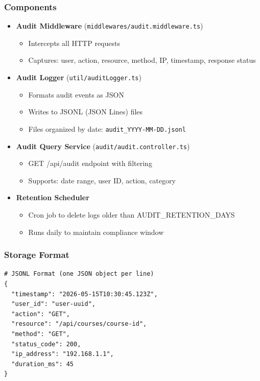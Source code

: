 \documentclass[12pt,oneside,a4paper]{article}
\begin{document}
\subsubsection{Components}
\begin{itemize}
    \item \textbf{Audit Middleware} (\texttt{middlewares/audit.middleware.ts})
        \begin{itemize}
            \item Intercepts all HTTP requests
            \item Captures: user, action, resource, method, IP, timestamp, response status
        \end{itemize}
    \item \textbf{Audit Logger} (\texttt{util/auditLogger.ts})
        \begin{itemize}
            \item Formats audit events as JSON
            \item Writes to JSONL (JSON Lines) files
            \item Files organized by date: \texttt{audit\_YYYY-MM-DD.jsonl}
        \end{itemize}
    \item \textbf{Audit Query Service} (\texttt{audit/audit.controller.ts})
        \begin{itemize}
            \item GET /api/audit endpoint with filtering
            \item Supports: date range, user ID, action, category
        \end{itemize}
    \item \textbf{Retention Scheduler}
        \begin{itemize}
            \item Cron job to delete logs older than AUDIT\_RETENTION\_DAYS
            \item Runs daily to maintain compliance window
        \end{itemize}
\end{itemize}

\subsubsection{Storage Format}
\begin{lstlisting}
# JSONL Format (one JSON object per line)
{
  "timestamp": "2026-05-15T10:30:45.123Z",
  "user_id": "user-uuid",
  "action": "GET",
  "resource": "/api/courses/course-id",
  "method": "GET",
  "status_code": 200,
  "ip_address": "192.168.1.1",
  "duration_ms": 45
}
\end{lstlisting}
\end{document}
